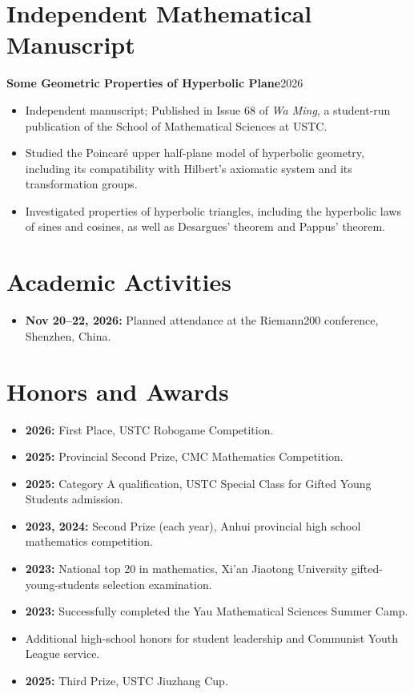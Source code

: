 \documentclass[10pt,a4paper]{article}
\begin{document}
\section*{Independent Mathematical Manuscript}
\textbf{Some Geometric Properties of Hyperbolic Plane}\hfill{\small 2026}\par
\begin{itemize}
\item Independent manuscript; Published in Issue 68 of \textit{Wa Ming}, a student-run publication of the School of Mathematical Sciences at USTC.

\item Studied the Poincaré upper half-plane model of hyperbolic geometry, including its compatibility with Hilbert's axiomatic system and its transformation groups.
\item Investigated properties of hyperbolic triangles, including the hyperbolic laws of sines and cosines, as well as Desargues' theorem and Pappus' theorem.
\end{itemize}
\section*{Academic Activities}
\begin{itemize}
\item \textbf{Nov 20--22, 2026:} Planned attendance at the Riemann200 conference, Shenzhen, China.
\end{itemize}
\section*{Honors and Awards}
\begin{itemize}
\item \textbf{2026:} First Place, USTC Robogame Competition.
\item \textbf{2025:} Provincial Second Prize, CMC Mathematics Competition.
\item \textbf{2025:} Category A qualification, USTC Special Class for Gifted Young Students admission.
\item \textbf{2023, 2024:} Second Prize (each year), Anhui provincial high school mathematics competition.
\item \textbf{2023:} National top 20 in mathematics, Xi'an Jiaotong University gifted-young-students selection examination.
\item \textbf{2023:} Successfully completed the Yau Mathematical Sciences Summer Camp.
\item Additional high-school honors for student leadership and Communist Youth League service.
\item \textbf{2025:} Third Prize, USTC Jiuzhang Cup.
\end{itemize}
\end{document}
